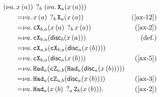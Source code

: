 \documentclass[a4paper,slovene]{article}
\begin{document}
\begin{example}
    \begin{align*}
        &\hspace{-3em}\measure{b}{\new{a}{x\p{a}}}{\new{a}{\apply{X}{a}{x\p{a}}}}\\
        =&\new{a}{\measureraw{b}{x\p{a}}{\apply{X}{a}{x\p{a}}}}&{(\ref{ax-12})}\\
        =&\new{a}{\apply{\ctl X}{b,a}{\measureraw{b}{x\p{a}}{x\p{a}}}}&{(\ref{ax-2})}\\
        =&\new{a}{\apply{\ctl X}{b,a}{\discard{b}{x\p{a}}}}&{(\text{def.})}\\
        =&\new{a}{\apply{\ctl X}{a,b}{\apply{\ctl X}{b,a}{\discard{a}{x\p{b}}}}}&\\
        =&\new{a}{\apply{\ctl X}{b,a}{\discard{a}{x\p{b}}}}&{(\ref{ax-5})}\\
        =&\new{a}{\apply{\had}{a}{\apply{\ctl Z}{a,b}{\apply{\had}{a}{\discard{a}{x\p{b}}}}}}&\\
        =&\new{a}{\apply{\had}{a}{\apply{\ctl Z}{a,b}{\discard{a}{x\p{b}}}}}&{(\ref{ax-3})}\\
        =&\new{a}{\apply{\had}{a}{\measureraw{a}{x\p{b}}{\apply{Z}{b}{x\p{b}}}}}.&(\ref{ax-2})
    \end{align*}
\end{example}

\printbibliography
\end{document}
